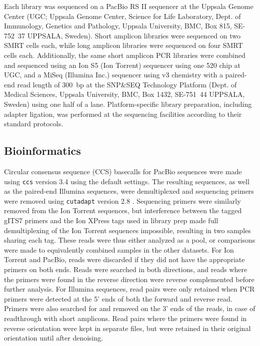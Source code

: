 \documentclass[
  12pt,
]{article}
\begin{document}
Each library was sequenced on a PacBio RS II sequencer at the Uppsala Genome Center (UGC; Uppsala Genome Center, Science
for Life Laboratory, Dept. of Immunology, Genetics and Pathology, Uppsala University, BMC, Box 815, SE-752~37 UPPSALA, Sweden).
Short amplicon libraries were sequenced on two SMRT cells each, while long amplicon libraries were sequenced on four SMRT cells each.
Additionally, the same short amplicon PCR libraries were combined and sequenced using an Ion S5 (Ion Torrent) sequencer using one 520 chip at UGC, and a MiSeq (Illumina Inc.) sequencer using v3 chemistry with a paired-end read length of 300~bp at the SNP\&SEQ Technology Platform (Dept. of Medical Sciences, Uppsala University, BMC, Box 1432, SE-751~44 UPPSALA, Sweden) using one half of a lane.
Platform-specific library preparation, including adapter ligation, was performed at the sequencing facilities according to their standard protocols.

\hypertarget{bioinformatics}{%
\subsection{Bioinformatics}\label{bioinformatics}}

Circular consensus sequence (CCS) basecalls for PacBio sequences were made using \texttt{ccs} version 3.4 \autocite{pacificbiosciences2019} using the default settings.
The resulting sequences, as well as the paired-end Illumina sequences, were demultiplexed and sequencing primers were removed using \texttt{cutadapt} version 2.8 \autocite{martin2011}.
Sequencing primers were similarly removed from the Ion Torrent sequences, but interference between the tagged gITS7 primers and the Ion XPress tags used in library prep made full demultiplexing of the Ion Torrent sequences impossible, resulting in two samples sharing each tag.
These reads were thus either analyzed as a pool, or comparisons were made to equivalently combined samples in the other datasets.
For Ion Torrent and PacBio, reads were discarded if they did not have the appropriate primers on both ends.
Reads were searched in both directions, and reads where the primers were found in the reverse direction were reverse complemented before further analysis.
For Illumina sequences, read pairs were only retained when PCR primers were detected at the 5' ends of both the forward and reverse read.
Primers were also searched for and removed on the 3' ends of the reads, in case of readthrough with short amplicons.
Read pairs where the primers were found in reverse orientation were kept in separate files, but were retained in their original orientation until after denoising.
\end{document}
